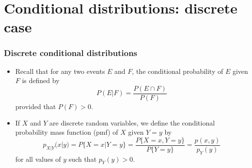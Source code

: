 \documentclass[slidestop,compress,mathserif]{beamer}
\begin{document}
%
%
%
%
%
%





\section{Conditional distributions: discrete case}



\begin{frame}\frametitle{Discrete conditional distributions}
\begin{itemize}
\item Recall that for any two events $E$ and $F$, the conditional probability of $E$ given $F$ is defined by
$$P(E|F) = \frac{P(E\cap F)}{P(F)}$$
provided that $P(F) > 0$.
\vspace{4mm}
\pause
\item If $X$ and $Y$ are discrete random variables, we define the conditional probability mass function (pmf) of $X$ given $Y=y$ by
$$p_{X|Y}(x|y) = P\{X = x|Y = y\} = \frac{P\{X = x, Y = y\}}{P\{Y = y\}} = \frac{p(x, y)}{p_Y(y)}$$
for all values of $y$ such that $p_Y(y) > 0$.
\end{itemize}
\end{frame}
\end{document}
